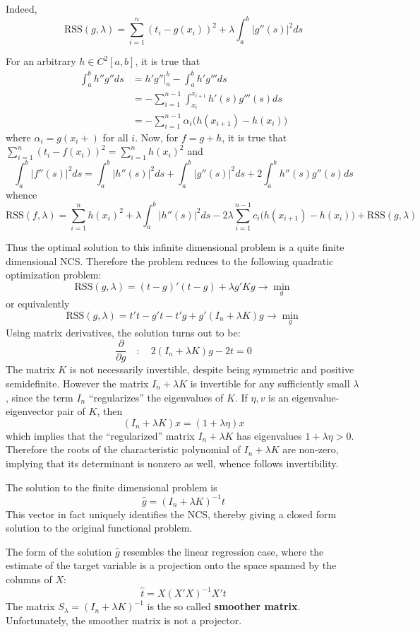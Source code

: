 \documentclass[a4paper]{article}
\newcommand{\RSS}{\text{RSS}}
\begin{document}
Indeed,
\[\RSS(g,\lambda) = \sum_{i=1}^n (t_i - g(x_i))^2 + \lambda \int_a^b |g''(s)|^2 ds\]

For an arbitrary $h\in C^2[a,b]$, it is true that
\begin{align*}
	\int_a^b h'' g'' ds
	&= h' g''\rvert_a^b - \int_a^b h' g''' ds\\
	&= - \sum_{i=1}^{n-1} \int_{x_i}^{x_{i+1}} h'(s) g'''(s) ds\\
	&= - \sum_{i=1}^{n-1}  \alpha_i \bigl(h(x_{i+1})-h(x_i)\bigr)
\end{align*}
where $\alpha_i = g(x_i+)$ for all $i$. Now, for $f = g+h$, it is true that
$\sum_{i=1}^n (t_i - f(x_i))^2 = \sum_{i=1}^n h(x_i)^2$ and
\[
\int_a^b |f''(s)|^2 ds
= \int_a^b |h''(s)|^2 ds + \int_a^b |g''(s)|^2 ds
+ 2\int_a^b h''(s)g''(s) ds
\]
whence
\[
\RSS(f,\lambda)
= \sum_{i=1}^n h(x_i)^2 + \lambda \int_a^b |h''(s)|^2 ds
	- 2 \lambda \sum_{i=1}^{n-1} c_i \bigl(h(x_{i+1})-h(x_i)\bigr)
	+ \RSS(g,\lambda)
\]



Thus the optimal solution to this infinite dimensional problem is a quite finite
dimensional NCS. Therefore the problem reduces to the following quadratic optimization
problem:
\[\RSS(g,\lambda) = (t - g)'(t - g) + \lambda g'K g \to \min_g\]
or equivalently
\[\RSS(g,\lambda) = t't - g't - t'g + g'( I_n + \lambda K )g \to \min_g\]
Using matrix derivatives, the solution turns out to be:
\[\frac{\partial}{\partial g} \quad:\quad 2( I_n + \lambda K ) g - 2 t = 0\]
The matrix $K$ is not necessarily invertible, despite being symmetric and positive
semidefinite. However the matrix $I_n + \lambda K$ is invertible for any sufficiently
small $\lambda$, since the term $I_n$ ``regularizes'' the eigenvalues of $K$.
If $\eta, v$ is an eigenvalue-eigenvector pair of $K$, then
\[(I_n + \lambda K)x = (1 + \lambda\eta)x\]
which implies that the ``regularized'' matrix $I_n + \lambda K$ has eigenvalues
$1 + \lambda\eta > 0$. Therefore the roots of the characteristic polynomial of
$I_n + \lambda K$ are non-zero, implying that its determinant is nonzero as well,
whence follows invertibility.

The solution to the finite dimensional problem is
\[\hat{g} = (I_n + \lambda K)^{-1} t\]
This vector in fact uniquely identifies the NCS, thereby giving a closed form solution
to the original functional problem.

The form of the solution $\hat{g}$ resembles the linear regression case, where
the estimate of the target variable is a projection onto the space spanned by the
columns of $X$:
\[\hat{t} = X(X'X)^{-1}X't\]
The matrix $S_\lambda = (I_n + \lambda K)^{-1}$ is the so called \textbf{smoother matrix}.
Unfortunately, the smoother matrix is not a projector.
\end{document}

